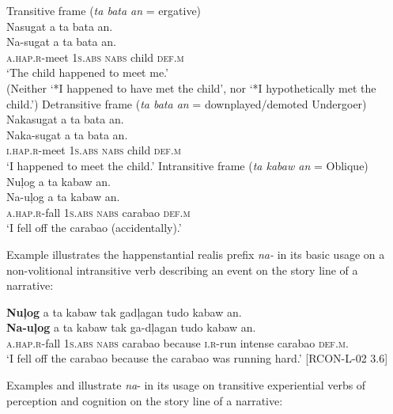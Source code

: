 \ea
    \ea    Transitive frame  (\textit{ta bata an} = ergative) \\
     Nasugat  a  ta  bata  an. \\\smallskip
 \gll Na-sugat  a  ta  bata  an. \\
     \textsc{a.hap.r}-meet  1\textsc{s.abs}  \textsc{nabs}  child  \textsc{def.m} \\
    \glt ‘The child happened to meet me.’ \\\smallskip
    (Neither ‘*I happened to have met the child’, nor ‘*I hypothetically met the child.’)
    \ex
    Detransitive frame (\textit{ta bata an} = downplayed/demoted Undergoer) \\
    Nakasugat  a  ta  bata  an. \\\smallskip
\gll Naka-sugat  a  ta  bata  an. \\
      \textsc{i.hap.r}-meet  1\textsc{s.abs}  \textsc{nabs}  child  \textsc{def.m} \\
    \glt  ‘I happened to meet the child.’
    \ex
    Intransitive frame (\textit{ta kabaw an} = Oblique) \\
    Nuļog  a  ta  kabaw  an. \\\smallskip
\gll Na-uļog  a  ta  kabaw  an. \\
    \textsc{a.hap.r}-fall  1\textsc{s.abs}  \textsc{nabs}  carabao  \textsc{def.m} \\
    \glt ‘I fell off the carabao (accidentally).’
    \z
\z

Example  illustrates the happenstantial realis prefix \textit{na-} in its basic usage on a non-volitional intransitive verb describing an event on the story line of a narrative:

\ea
\label{bkm:Ref392922279} \label{bkm:Ref447862443}
\textbf{Nuļog}  a  ta  kabaw  tak  gadļagan  tudo  kabaw  an. \\\smallskip
 \gll \textbf{Na-uļog}  a  ta  kabaw  tak  ga-dļagan  tudo  kabaw  an. \\
\textsc{a.hap.r}-fall  1\textsc{s.abs}  \textsc{nabs}  carabao  because  \textsc{i.r}-run  intense  carabao  \textsc{def.m.}\textsc{} \\
\glt ‘I fell off the carabao because the carabao was running hard.’ [RCON-L-02 3.6]
\z

Examples  and  illustrate \textit{na}{}- in its usage on transitive experiential verbs of perception and cognition on the story line of a narrative:

